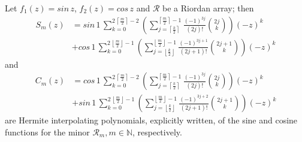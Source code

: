 
\begin{theorem}
\label{thm:sin-Hermite-interpolating-polys}
Let $f_{1}(z)=sin\,{z}$, $f_{2}(z)=cos\,{z}$ and $\mathcal{R}$ be a Riordan array; then 
\begin{equation}
  \label{eq:sin-Hermite-interpolating-poly}
  \begin{split}
  S_{m}(z)  &= sin\,{1}\,\sum_{k=0}^{2\,\left\lceil \frac{m}{2} \right\rceil-2}{\left(\sum_{j=\left\lceil \frac{k}{2}\right\rceil}^{\left\lceil \frac{m}{2} \right\rceil -1}{\frac{(-1)^{3j}}{(2j)!}{2j\choose k}}\right) {(-z)^{k}}}\\
            &+ cos\,{1}\,\sum_{k=0}^{2\,\left\lfloor \frac{m}{2} \right\rfloor-1}{\left(\sum_{j=\left\lfloor \frac{k}{2}\right\rfloor}^{\left\lfloor \frac{m}{2} \right\rfloor -1}{\frac{(-1)^{3j+1}}{(2j + 1)!} {2j+1\choose k}}\right){(-z)^{k}}}
  \end{split}
\end{equation}
and
\begin{equation}
  \begin{split}
  \label{eq:cos-Hermite-interpolating-poly-implicit}
  C_{m}(z)  &= cos\,{1}\,\sum_{k=0}^{2\,\left\lceil \frac{m}{2} \right\rceil-2}{\left(\sum_{j=\left\lceil \frac{k}{2}\right\rceil}^{\left\lceil \frac{m}{2} \right\rceil -1}{\frac{(-1)^{3j}}{(2j)!}{2j\choose k}}\right) {(-z)^{k}}}\\
            &+ sin\,{1}\,\sum_{k=0}^{2\,\left\lfloor \frac{m}{2} \right\rfloor-1}{\left(\sum_{j=\left\lfloor \frac{k}{2}\right\rfloor}^{\left\lfloor \frac{m}{2} \right\rfloor -1}{\frac{(-1)^{3j+2}}{(2j + 1)!} {2j+1\choose k}}\right){(-z)^{k}}}
  \end{split}
\end{equation}
are Hermite interpolating polynomials, explicitly written, of the sine and
cosine functions for the minor $\mathcal{R}_{m}, m\in\mathbb{N}$, respectively.
\end{theorem}

